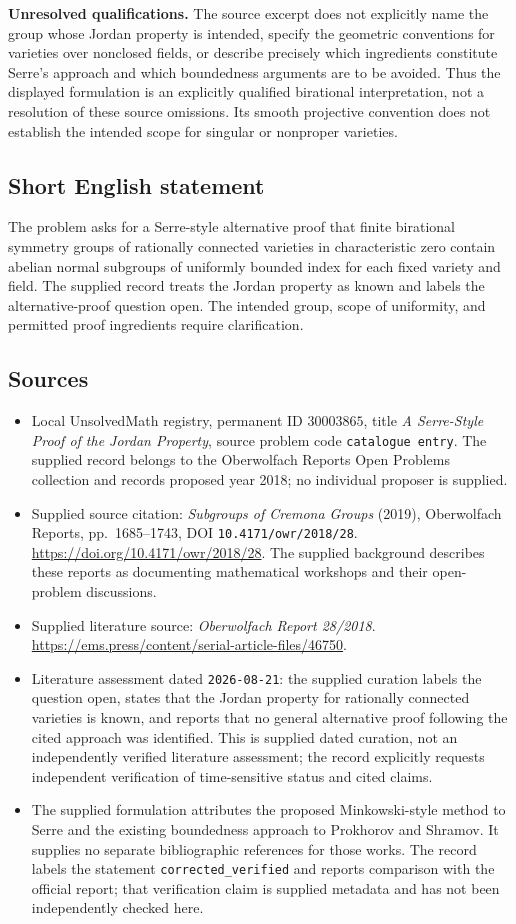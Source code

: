 \documentclass[11pt]{article}
\begin{document}
\textbf{Unresolved qualifications.} The source excerpt does not explicitly name the group whose Jordan property is intended, specify the geometric conventions for varieties over nonclosed fields, or describe precisely which ingredients constitute Serre's approach and which boundedness arguments are to be avoided. Thus the displayed formulation is an explicitly qualified birational interpretation, not a resolution of these source omissions. Its smooth projective convention does not establish the intended scope for singular or nonproper varieties.
\subsection{Short English statement}
The problem asks for a Serre-style alternative proof that finite birational symmetry groups of rationally connected varieties in characteristic zero contain abelian normal subgroups of uniformly bounded index for each fixed variety and field. The supplied record treats the Jordan property as known and labels the alternative-proof question open. The intended group, scope of uniformity, and permitted proof ingredients require clarification.
\subsection{Sources}
\begin{itemize}
\item Local UnsolvedMath registry, permanent ID \(30003865\), title \emph{A Serre-Style Proof of the Jordan Property}, source problem code \texttt{catalogue entry}. The supplied record belongs to the Oberwolfach Reports Open Problems collection and records proposed year 2018; no individual proposer is supplied.
\item Supplied source citation: \emph{Subgroups of Cremona Groups} (2019), Oberwolfach Reports, pp.\ 1685--1743, DOI \texttt{10.4171/owr/2018/28}. \url{https://doi.org/10.4171/owr/2018/28}. The supplied background describes these reports as documenting mathematical workshops and their open-problem discussions.
\item Supplied literature source: \emph{Oberwolfach Report 28/2018}. \url{https://ems.press/content/serial-article-files/46750}.
\item Literature assessment dated \texttt{2026-08-21}: the supplied curation labels the question open, states that the Jordan property for rationally connected varieties is known, and reports that no general alternative proof following the cited approach was identified. This is supplied dated curation, not an independently verified literature assessment; the record explicitly requests independent verification of time-sensitive status and cited claims.
\item The supplied formulation attributes the proposed Minkowski-style method to Serre and the existing boundedness approach to Prokhorov and Shramov. It supplies no separate bibliographic references for those works. The record labels the statement \texttt{corrected\_verified} and reports comparison with the official report; that verification claim is supplied metadata and has not been independently checked here.
\end{itemize}
\end{document}
